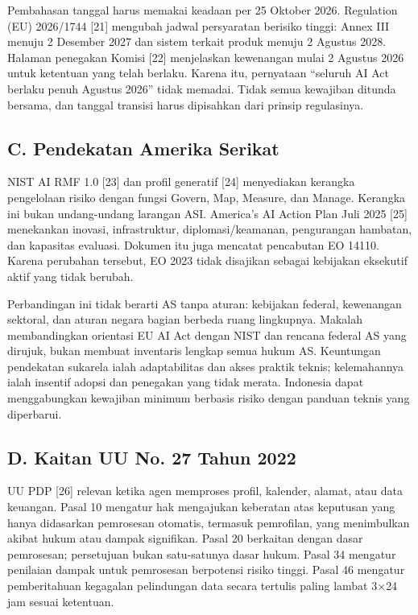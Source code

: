 \documentclass[conference,a4paper]{IEEEtran}
\begin{document}
Pembahasan tanggal harus memakai keadaan per 25 Oktober 2026. Regulation (EU) 2026/1744 [21] mengubah jadwal persyaratan berisiko tinggi: Annex III menuju 2 Desember 2027 dan sistem terkait produk menuju 2 Agustus 2028. Halaman penegakan Komisi [22] menjelaskan kewenangan mulai 2 Agustus 2026 untuk ketentuan yang telah berlaku. Karena itu, pernyataan ``seluruh AI Act berlaku penuh Agustus 2026'' tidak memadai. Tidak semua kewajiban ditunda bersama, dan tanggal transisi harus dipisahkan dari prinsip regulasinya.

\subsection*{C. Pendekatan Amerika Serikat}
NIST AI RMF 1.0 [23] dan profil generatif [24] menyediakan kerangka pengelolaan risiko dengan fungsi Govern, Map, Measure, dan Manage. Kerangka ini bukan undang-undang larangan ASI. America's AI Action Plan Juli 2025 [25] menekankan inovasi, infrastruktur, diplomasi/keamanan, pengurangan hambatan, dan kapasitas evaluasi. Dokumen itu juga mencatat pencabutan EO 14110. Karena perubahan tersebut, EO 2023 tidak disajikan sebagai kebijakan eksekutif aktif yang tidak berubah.

Perbandingan ini tidak berarti AS tanpa aturan: kebijakan federal, kewenangan sektoral, dan aturan negara bagian berbeda ruang lingkupnya. Makalah membandingkan orientasi EU AI Act dengan NIST dan rencana federal AS yang dirujuk, bukan membuat inventaris lengkap semua hukum AS. Keuntungan pendekatan sukarela ialah adaptabilitas dan akses praktik teknis; kelemahannya ialah insentif adopsi dan penegakan yang tidak merata. Indonesia dapat menggabungkan kewajiban minimum berbasis risiko dengan panduan teknis yang diperbarui.

\subsection*{D. Kaitan UU No. 27 Tahun 2022}
UU PDP [26] relevan ketika agen memproses profil, kalender, alamat, atau data keuangan. Pasal 10 mengatur hak mengajukan keberatan atas keputusan yang hanya didasarkan pemrosesan otomatis, termasuk pemrofilan, yang menimbulkan akibat hukum atau dampak signifikan. Pasal 20 berkaitan dengan dasar pemrosesan; persetujuan bukan satu-satunya dasar hukum. Pasal 34 mengatur penilaian dampak untuk pemrosesan berpotensi risiko tinggi. Pasal 46 mengatur pemberitahuan kegagalan pelindungan data secara tertulis paling lambat 3$\times$24 jam sesuai ketentuan.
\end{document}
